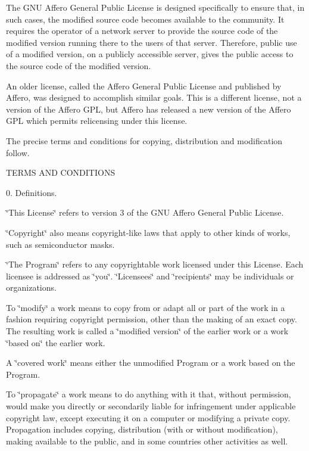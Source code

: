 The G\-N\-U Affero General Public License is designed specifically to ensure that, in such cases, the modified source code becomes available to the community. It requires the operator of a network server to provide the source code of the modified version running there to the users of that server. Therefore, public use of a modified version, on a publicly accessible server, gives the public access to the source code of the modified version.

An older license, called the Affero General Public License and published by Affero, was designed to accomplish similar goals. This is a different license, not a version of the Affero G\-P\-L, but Affero has released a new version of the Affero G\-P\-L which permits relicensing under this license.

The precise terms and conditions for copying, distribution and modification follow. \begin{DoxyVerb}                   TERMS AND CONDITIONS
\end{DoxyVerb}


0. Definitions.

\char`\"{}\-This License\char`\"{} refers to version 3 of the G\-N\-U Affero General Public License.

\char`\"{}\-Copyright\char`\"{} also means copyright-\/like laws that apply to other kinds of works, such as semiconductor masks.

\char`\"{}\-The Program\char`\"{} refers to any copyrightable work licensed under this License. Each licensee is addressed as \char`\"{}you\char`\"{}. \char`\"{}\-Licensees\char`\"{} and \char`\"{}recipients\char`\"{} may be individuals or organizations.

To \char`\"{}modify\char`\"{} a work means to copy from or adapt all or part of the work in a fashion requiring copyright permission, other than the making of an exact copy. The resulting work is called a \char`\"{}modified version\char`\"{} of the earlier work or a work \char`\"{}based on\char`\"{} the earlier work.

A \char`\"{}covered work\char`\"{} means either the unmodified Program or a work based on the Program.

To \char`\"{}propagate\char`\"{} a work means to do anything with it that, without permission, would make you directly or secondarily liable for infringement under applicable copyright law, except executing it on a computer or modifying a private copy. Propagation includes copying, distribution (with or without modification), making available to the public, and in some countries other activities as well.

